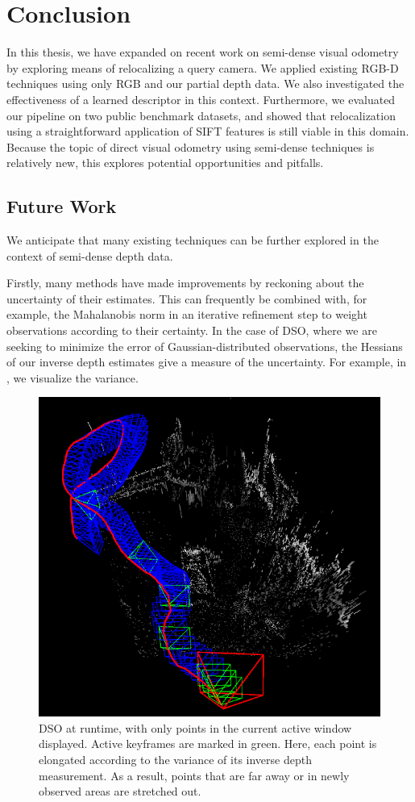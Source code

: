 
\chapter{Conclusion}

In this thesis, we have expanded on recent work on semi-dense visual odometry by exploring means of relocalizing a query camera. We applied existing RGB-D techniques using only RGB and our partial depth data. We also investigated the effectiveness of a learned descriptor in this context. Furthermore, we evaluated our pipeline on two public benchmark datasets, and showed that relocalization using a straightforward application of SIFT features is still viable in this domain. Because the topic of direct visual odometry using semi-dense techniques is relatively new, this explores potential opportunities and pitfalls.

\section{Future Work}

We anticipate that many existing techniques can be further explored in the context of semi-dense depth data.

Firstly, many methods \cite{valentin2015exploiting} \cite{schmidt2017self} have made improvements by reckoning about the uncertainty of their estimates. This can frequently be combined with, for example, the Mahalanobis norm in an iterative refinement step to weight observations according to their certainty. In the case of DSO, where we are seeking to minimize the error of Gaussian-distributed observations, the Hessians of our inverse depth estimates give a measure of the uncertainty. For example, in , we visualize the variance.

\begin{figure}[h]
	\centering
	\includegraphics[width=0.4\linewidth]{conclusion/uncertainty.png}
	\caption{DSO at runtime, with only points in the current active window displayed. Active keyframes are marked in green. Here, each point is elongated according to the variance of its inverse depth measurement. As a result, points that are far away or in newly observed areas are stretched out.}
	\label{fig:uncertainty}
\end{figure}

